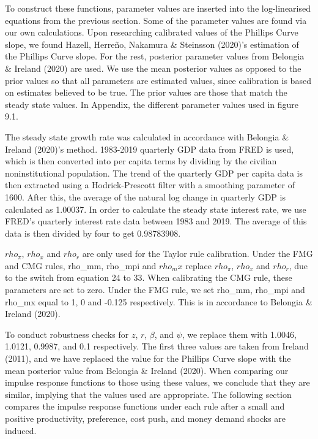 \documentclass[11pt,preprint, authoryear]{elsarticle}
\numberwithin{equation}{section}
\numberwithin{figure}{section}
\numberwithin{table}{section}
\begin{document}
To construct these functions, parameter values are inserted into the
log-linearised equations from the previous section. Some of the
parameter values are found via our own calculations. Upon researching
calibrated values of the Phillips Curve slope, we found Hazell, Herreño,
Nakamura \& Steinsson (2020)'s estimation of the Phillips Curve slope.
For the rest, posterior parameter values from Belongia \& Ireland (2020)
are used. We use the mean posterior values as opposed to the prior
values so that all parameters are estimated values, since calibration is
based on estimates believed to be true. The prior values are those that
match the steady state values. In Appendix, the different parameter
values used in figure 9.1.

The steady state growth rate was calculated in accordance with Belongia
\& Ireland (2020)'s method. 1983-2019 quarterly GDP data from FRED is
used, which is then converted into per capita terms by dividing by the
civilian noninstitutional population. The trend of the quarterly GDP per
capita data is then extracted using a Hodrick-Prescott filter with a
smoothing parameter of 1600. After this, the average of the natural log
change in quarterly GDP is calculated as 1.00037. In order to calculate
the steady state interest rate, we use FRED's quarterly interest rate
data between 1983 and 2019. The average of this data is then divided by
four to get 0.98783908.

\(rho_\pi\), \(rho_x\) and \(rho_r\) are only used for the Taylor rule
calibration. Under the FMG and CMG rules, rho\_mm, rho\_mpi and
\(rho_mx\) replace \(rho_\pi\), \(rho_x\) and \(rho_r\), due to the
switch from equation 24 to 33. When calibrating the CMG rule, these
parameters are set to zero. Under the FMG rule, we set rho\_mm, rho\_mpi
and rho\_mx equal to 1, 0 and -0.125 respectively. This is in accordance
to Belongia \& Ireland (2020).

To conduct robustness checks for \(z\), \(r\), \(\beta\), and \(\psi\),
we replace them with 1.0046, 1.0121, 0.9987, and 0.1 respectively. The
first three values are taken from Ireland (2011), and we have replaced
the value for the Phillips Curve slope with the mean posterior value
from Belongia \& Ireland (2020). When comparing our impulse response
functions to those using these values, we conclude that they are
similar, implying that the values used are appropriate. The following
section compares the impulse response functions under each rule after a
small and positive productivity, preference, cost push, and money demand
shocks are induced.
\end{document}
